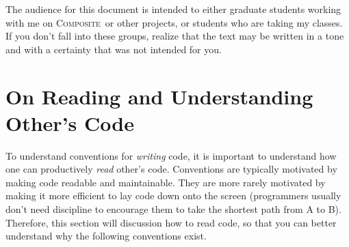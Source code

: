 \documentclass[11pt,onecolumn]{article}
\def\composite{\textsc{Composite}}
\begin{document}
The audience for this document is intended to either graduate students
working with me on \composite\ or other projects, or students who are
taking my classes.  If you don't fall into these groups, realize that
the text may be written in a tone and with a certainty that was not
intended for you.

\section{On Reading and Understanding Other's Code}
\label{s:reading}

To understand conventions for {\em writing} code, it is important to
understand how one can productively {\em read} other's code.
Conventions are typically motivated by making code readable and
maintainable.  They are more rarely motivated by making it more
efficient to lay code down onto the screen (programmers usually don't
need discipline to encourage them to take the shortest path from A to
B).  Therefore, this section will discussion how to read code, so that
you can better understand why the following conventions exist.
\end{document}
